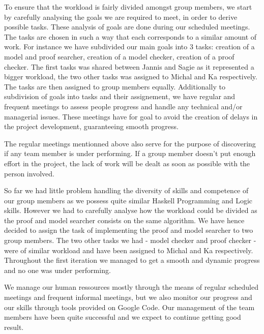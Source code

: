 To ensure that the workload is fairly divided amongst group members, we start by carefully analysing the goals we are required to meet, in order to derive possible tasks. These analysis of goals are done during our scheduled meetings. The tasks are chosen in such a way that each corresponds to a similar amount of work. For instance we have subdivided our main goals into 3 tasks: creation of a model and proof searcher, creation of a model checker, creation of a proof checker. The first tasks was shared between Jannis and Sagie as it represented a bigger workload, the two other tasks was assigned to Michal and Ka respectively. The tasks are then assigned to group members equally. Additionally to subdivision of goals into tasks and their assignement, we have regular and frequent meetings to assess people progress and handle any technical and/or managerial issues. These meetings have for goal to avoid the creation of delays in the project development, guaranteeing smooth progress.

The regular meetings mentionned above also serve for the purpose of discovering if any team member is under performing. If a group member doesn't put enough effort in the project, the lack of work will be dealt as soon as possible with the person involved.

So far we had little problem handling the diversity of skills and competence of our group members as we possess quite similar Haskell Programming and Logic skills. However we had to carefully analyse how the workload could be divided as the proof and model searcher consists on the same algorithm. We have hence decided to assign the task of implementing the proof and model searcher to two group members. The two other tasks we had - model checker and proof checker - were of similar workload and have been assigned to Michal and Ka respectively. Throughout the first iteration we managed to get a smooth and dynamic progress and no one was under performing.

We manage our human ressources mostly through the means of regular scheduled meetings and frequent informal meetings, but we also monitor our progress and our skills through tools provided on Google Code. Our management of the team members have been quite successful and we expect to continue getting good result. 
